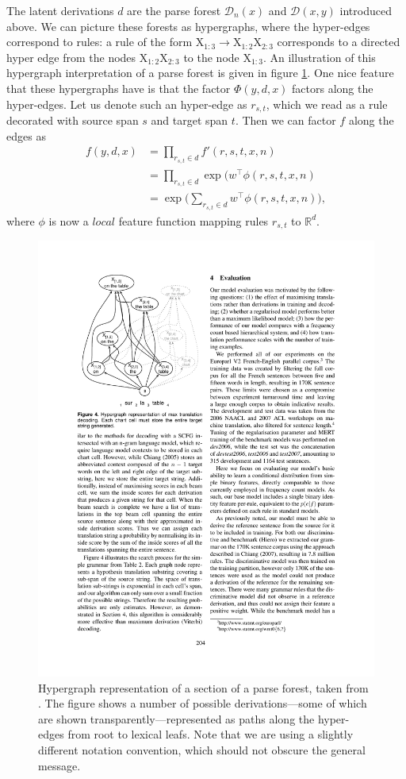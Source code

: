 \documentclass[11pt,a4paper]{article}
\begin{document}
The latent derivations $d$ are the parse forest $\mathcal{D}_n(x)$
and $\mathcal{D}(x,y)$ introduced above. We can picture these forests as hypergraphs, where the hyper-edges correspond to rules: a rule of the form $\text{X}_{1:3}\to\text{X}_{1:2}\text{X}_{2:3}$ corresponds to a directed hyper edge from the nodes $\text{X}_{1:2}\text{X}_{2:3}$ to the node $\text{X}_{1:3}$. An illustration of this hypergraph interpretation of a parse forest is given in figure \ref{fig:decoding}. One nice feature that these hypergraphs have is that the factor $\Phi(y,d,x)$ factors along the hyper-edges. Let us denote such an hyper-edge as $r_{s,t}$, which we read as a rule decorated with source span $s$ and target span $t$. Then we can factor $f$ along the edges as
\begin{align*}
    f(y,d,x) 
        &= \prod_{r_{s,t}\in d}f'(r,s,t,x,n) \\
        &= \prod_{r_{s,t}\in d}\exp(w^{\top}\phi(r,s,t,x,n) \\
        &= \exp\Big(\sum_{r_{s,t}\in d}w^{\top}\phi(r,s,t,x,n)\Big),
\end{align*}
where $\phi$ is now a $local$ feature function mapping rules $r_{s,t}$ to $\mathbb{R}^d$.
\begin{figure}[H]
    \includegraphics[scale=0.9]{images/CRF.pdf}
    \caption{Hypergraph representation of a section of a parse forest, taken from \cite{blunsom2008discriminative}. The figure shows a number of possible derivations---some of which are shown transparently---represented as paths along the hyper-edges from root to lexical leafs. Note that we are using a slightly different notation convention, which should not obscure the general message.}
    \label{fig:decoding}
\end{figure}
\end{document}
